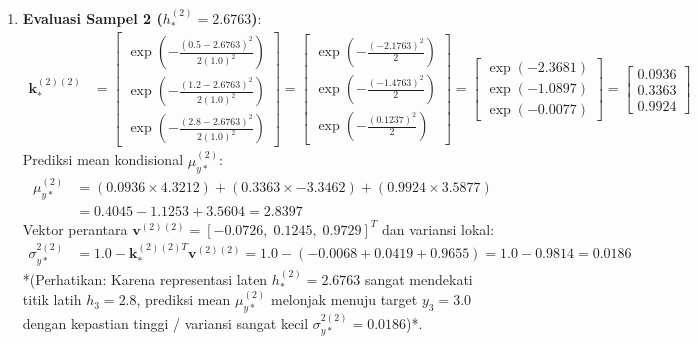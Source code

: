 \documentclass[11pt,a4paper]{article}
\begin{document}
\begin{enumerate}
    \item \textbf{Evaluasi Sampel 2 ($h_*^{(2)} = 2.6763$)}:
    \begin{align}
    \mathbf{k}_*^{(2)(2)} &= \begin{bmatrix} \exp\left(-\frac{(0.5 - 2.6763)^2}{2(1.0)^2}\right) \\ \exp\left(-\frac{(1.2 - 2.6763)^2}{2(1.0)^2}\right) \\ \exp\left(-\frac{(2.8 - 2.6763)^2}{2(1.0)^2}\right) \end{bmatrix} = \begin{bmatrix} \exp\left(-\frac{(-2.1763)^2}{2}\right) \\ \exp\left(-\frac{(-1.4763)^2}{2}\right) \\ \exp\left(-\frac{(0.1237)^2}{2}\right) \end{bmatrix} = \begin{bmatrix} \exp(-2.3681) \\ \exp(-1.0897) \\ \exp(-0.0077) \end{bmatrix} = \begin{bmatrix} \mathbf{0.0936} \\ \mathbf{0.3363} \\ \mathbf{0.9924} \end{bmatrix}
    \end{align}
    Prediksi mean kondisional $\mu_{y*}^{(2)}$:
    \begin{align}
    \mu_{y*}^{(2)} &= (0.0936 \times 4.3212) + (0.3363 \times -3.3462) + (0.9924 \times 3.5877) \nonumber \\
    &= 0.4045 - 1.1253 + 3.5604 = \mathbf{2.8397}
    \end{align}
    Vektor perantara $\mathbf{v}^{(2)(2)} = [-0.0726, \; 0.1245, \; 0.9729]^T$ dan variansi lokal:
    \begin{align}
    \sigma_{y*}^{2(2)} &= 1.0 - \mathbf{k}_*^{(2)(2)T} \mathbf{v}^{(2)(2)} = 1.0 - (-0.0068 + 0.0419 + 0.9655) = 1.0 - 0.9814 = \mathbf{0.0186}
    \end{align}
    *(Perhatikan: Karena representasi laten $h_*^{(2)} = 2.6763$ sangat mendekati titik latih $h_3 = 2.8$, prediksi mean $\mu_{y*}^{(2)}$ melonjak menuju target $y_3 = 3.0$ dengan kepastian tinggi / variansi sangat kecil $\sigma_{y*}^{2(2)} = 0.0186$)*.
    

\end{enumerate}
\end{document}

